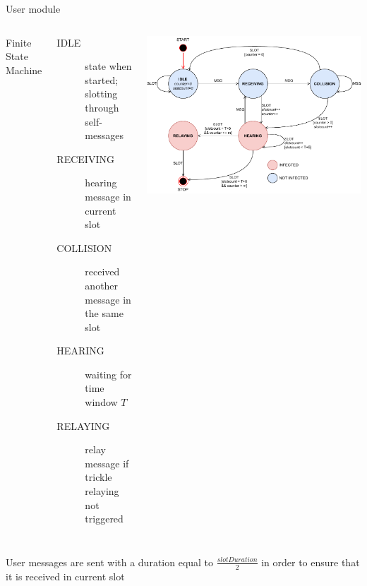 \documentclass[aspectratio=169]{beamer}
\begin{document}
\begin{frame}{User module}
	\begin{columns}
		Finite State Machine
		\begin{description}
			\item[IDLE] state when started; slotting through
				self-messages
			\item[RECEIVING] hearing message in current slot
			\item[COLLISION] received another message in the same
				slot
			\item[HEARING] waiting for time window \(T\)
			\item[RELAYING] relay message if trickle relaying not
				triggered
		\end{description}
		\includegraphics[width=\textwidth]{img/userfsm}
	\end{columns}
	User messages are sent with a duration equal to
	\(\frac{slotDuration}{2}\) in order to ensure that it is
	received in current slot
\end{frame}
\end{document}
